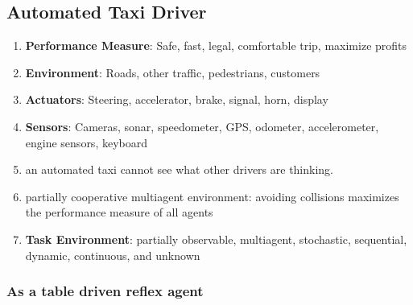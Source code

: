 \subsection{Automated Taxi Driver \cite{ai/book/Artificial-Intelligence-A-Modern-Approach/Russell-Norvig}}

\begin{enumerate}[itemsep=0.2cm]
    \item \textbf{Performance Measure}: Safe, fast, legal, comfortable trip, maximize profits
    \hfill \cite{ai/book/Artificial-Intelligence-A-Modern-Approach/Russell-Norvig}

    \item \textbf{Environment}: Roads, other traffic, pedestrians, customers
    \hfill \cite{ai/book/Artificial-Intelligence-A-Modern-Approach/Russell-Norvig}

    \item \textbf{Actuators}: Steering, accelerator, brake, signal, horn, display
    \hfill \cite{ai/book/Artificial-Intelligence-A-Modern-Approach/Russell-Norvig}

    \item \textbf{Sensors}: Cameras, sonar, speedometer, GPS, odometer, accelerometer, engine sensors, keyboard
    \hfill \cite{ai/book/Artificial-Intelligence-A-Modern-Approach/Russell-Norvig}

    \item an automated taxi cannot see what other drivers are thinking.
    \hfill \cite{ai/book/Artificial-Intelligence-A-Modern-Approach/Russell-Norvig}

    \item partially cooperative multiagent environment: avoiding collisions maximizes the performance measure of all agents
    \hfill \cite{ai/book/Artificial-Intelligence-A-Modern-Approach/Russell-Norvig}

    \item \textbf{Task Environment}: partially observable, multiagent, stochastic, sequential, dynamic, continuous, and unknown
    \hfill \cite{ai/book/Artificial-Intelligence-A-Modern-Approach/Russell-Norvig}
    
\end{enumerate}



\subsubsection{As a table driven reflex agent}

